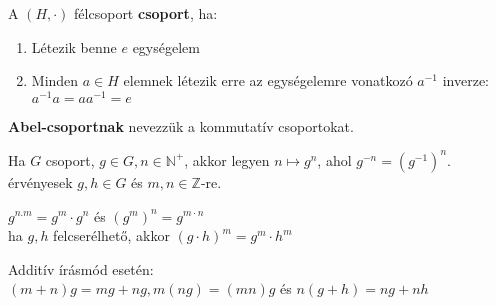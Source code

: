 \begin{frame}
  \begin{tcolorbox}[title={Def.: Csoport, Abel-csoport}]
    A $(H, {\cdot})$ félcsoport \textbf{csoport}, ha:
    \begin{enumerate}
      \item Létezik benne $e$ egységelem
      \item Minden $a \in H$ elemnek létezik erre az egységelemre vonatkozó $a^{-1}$ inverze: $a^{-1}a = aa^{-1} = e$
    \end{enumerate}
    \mmedskip

    \textbf{Abel-csoportnak} nevezzük a kommutatív csoportokat.
  \end{tcolorbox}

  \begin{tcolorbox}[title={Def.: $n$ tényezős szorzat / Hatványozás egész kitevővel}]
    Ha $G$ csoport, $g \in G, n \in \mathbb{N}^+$, akkor legyen $n \mapsto g^n$, ahol $g^{-n} = (g^{-1})^n$.\\
    érvényesek $g, h \in G$ és $m, n \in \mathbb{Z}$-re.\\
    \msmallskip

    $g^{n . m} = g^m \cdot g^n$ és $(g^m)^n = g^{m \cdot n}$\\
    ha $g, h$ felcserélhető, akkor $(g \cdot h)^m = g^m \cdot h^m$\\
    \msmallskip

    Additív írásmód esetén:\\
    $(m + n)g = mg + ng, m(ng) = (mn)g$ és $n(g + h) = ng + nh$
  \end{tcolorbox}
\end{frame}


